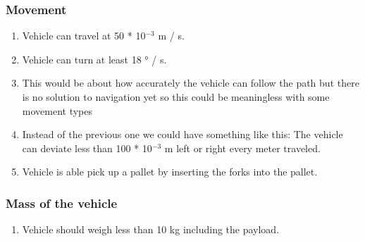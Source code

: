 \documentclass{article}
\begin{document}
        \subsubsection{Movement}
           \begin{center}
                \begin{enumerate}
                    \item Vehicle can travel at 50 * 10$^{-3}$ m / s.
                    \item Vehicle can turn at least 18 ° / s. %
                    \item This would be about how accurately the vehicle can follow the path but there is no solution to navigation yet so this could be meaningless with some movement types
                    \item Instead of the previous one we could have something like this: The vehicle can deviate less than 100 * 10$^{-3}$ m left or right every meter traveled.
                    \item Vehicle is able pick up a pallet by inserting the forks into the pallet. %
                \end{enumerate}
            \end{center}

        \subsubsection{Mass of the vehicle}
        \begin{center}
            \begin{enumerate}
                \item Vehicle should weigh less than 10 kg including the payload. %
            \end{enumerate}
        \end{center}
\end{document}
